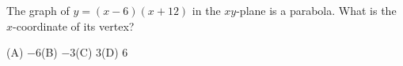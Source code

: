 The graph of $y=(x-6)(x+12)$ in the $xy$-plane is a parabola. What is the $x$-coordinate of its vertex?

(A) $-6$\qquad (B) $-3$\qquad (C) $3$\qquad (D) $6$
